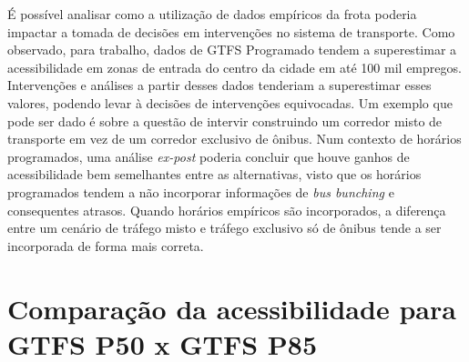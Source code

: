 \documentclass[        
    a4paper,          %
    12pt,             %
    chapter=TITLE,    %
    section=Title,    %
    subsection=Title, %
    oneside,          %
    english,          %
    spanish,          %
    brazil,           %
    fleqn             %
]{abntex2}
\begin{document}
  \begin{figure}[!h]
  \captionsetup{width=16cm}
  \centering
  \end{figure}
  
  É possível analisar como a utilização de dados empíricos da frota poderia impactar a tomada de decisões em intervenções no sistema de transporte. Como observado, para trabalho, dados de GTFS Programado tendem a superestimar a acessibilidade em zonas de entrada do centro da cidade em até 100 mil empregos. Intervenções e análises a partir desses dados tenderiam a superestimar esses valores, podendo levar à decisões de intervenções equivocadas. Um exemplo que pode ser dado é sobre a questão de intervir construindo um corredor misto de transporte em vez de um corredor exclusivo de ônibus. Num contexto de horários programados, uma análise \emph{ex-post} poderia concluir que houve ganhos de acessibilidade bem semelhantes entre as alternativas, visto que os horários programados tendem a não incorporar informações de \emph{bus bunching} e consequentes atrasos. Quando horários empíricos são incorporados, a diferença entre um cenário de tráfego misto e tráfego exclusivo só de ônibus tende a ser incorporada de forma mais correta.
  
  \hypertarget{comparacao-da-acessibilidade-para-gtfs-p50-x-gtfs-p85}{%
  \section{Comparação da acessibilidade para GTFS P50 x GTFS P85}\label{comparacao-da-acessibilidade-para-gtfs-p50-x-gtfs-p85}}
  
\end{document}
